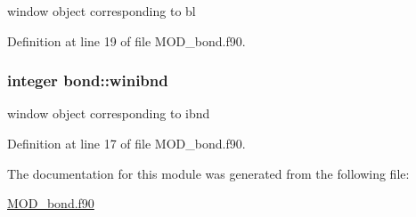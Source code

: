 window object corresponding to bl 



Definition at line 19 of file M\-O\-D\-\_\-bond.\-f90.

\hypertarget{classbond_a3c968c3e9d38bde7c64c25e61cd89d56}{
\subsubsection[{winibnd}]{\setlength{\rightskip}{0pt plus 5cm}integer bond\-::winibnd}}\label{classbond_a3c968c3e9d38bde7c64c25e61cd89d56}


window object corresponding to ibnd 



Definition at line 17 of file M\-O\-D\-\_\-bond.\-f90.



The documentation for this module was generated from the following file\-:\begin{DoxyCompactItemize}
\item 
\hyperlink{MOD__bond_8f90}{M\-O\-D\-\_\-bond.\-f90}\end{DoxyCompactItemize}
